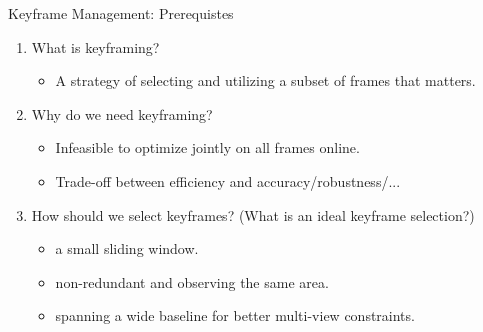 \begin{Frame}{Keyframe Management: Prerequistes}
	\begin{enumerate}[<+- |alert@+>]
		\setlength{\itemsep}{3ex}
		\item What is keyframing?
		      \vspace*{1.5ex}
		      \begin{itemize}
			      \setlength{\itemsep}{1.5ex}
			      \item A strategy of selecting and utilizing a subset of frames that matters.
		      \end{itemize}
		\item Why do we need keyframing?
		      \vspace*{1.5ex}
		      \begin{itemize}
			      \setlength{\itemsep}{1.5ex}
			      \item Infeasible to optimize jointly on all frames online.
			      \item Trade-off between efficiency and accuracy/robustness/...
		      \end{itemize}
		\item How should we select keyframes? (What is an ideal keyframe selection?)
		      \vspace*{1.5ex}
		      \begin{itemize}
			      \setlength{\itemsep}{1.5ex}
			      \item a small sliding window.
			      \item non-redundant and observing the same area.
			      \item spanning a wide baseline for better multi-view constraints.
		      \end{itemize}
	\end{enumerate}
\end{Frame}

